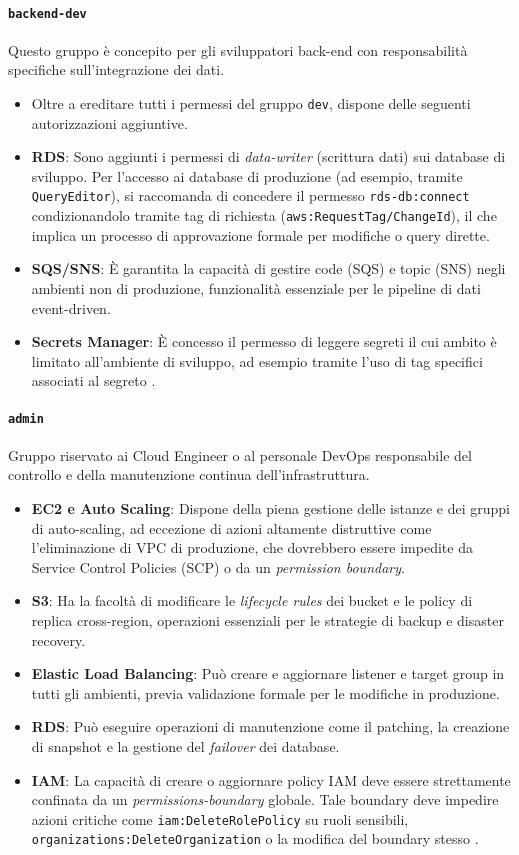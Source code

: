 \paragraph{\texttt{backend-dev}}
Questo gruppo è concepito per gli sviluppatori back-end con responsabilità specifiche sull'integrazione dei dati.
\begin{itemize}
  \item Oltre a ereditare tutti i permessi del gruppo \texttt{dev}, dispone delle seguenti autorizzazioni aggiuntive.
  \item \textbf{RDS}: Sono aggiunti i permessi di \emph{data-writer} (scrittura dati) sui database di sviluppo. Per l'accesso ai database di produzione (ad esempio, tramite \texttt{QueryEditor}), si raccomanda di concedere il permesso \texttt{rds-db:connect} condizionandolo tramite tag di richiesta (\texttt{aws:RequestTag/ChangeId}), il che implica un processo di approvazione formale per modifiche o query dirette.
  \item \textbf{SQS/SNS}: È garantita la capacità di gestire code (SQS) e topic (SNS) negli ambienti non di produzione, funzionalità essenziale per le pipeline di dati event-driven.
  \item \textbf{Secrets Manager}: È concesso il permesso di leggere segreti il cui ambito è limitato all'ambiente di sviluppo, ad esempio tramite l'uso di tag specifici associati al segreto \cite{AWSIAMBestPractices}.
\end{itemize}

\paragraph{\texttt{admin}}
Gruppo riservato ai Cloud Engineer o al personale DevOps responsabile del controllo e della manutenzione continua dell'infrastruttura.
\begin{itemize}
  \item \textbf{EC2 e Auto Scaling}: Dispone della piena gestione delle istanze e dei gruppi di auto-scaling, ad eccezione di azioni altamente distruttive come l'eliminazione di VPC di produzione, che dovrebbero essere impedite da Service Control Policies (SCP) o da un \emph{permission boundary}.
  \item \textbf{S3}: Ha la facoltà di modificare le \emph{lifecycle rules} dei bucket e le policy di replica cross-region, operazioni essenziali per le strategie di backup e disaster recovery.
  \item \textbf{Elastic Load Balancing}: Può creare e aggiornare listener e target group in tutti gli ambienti, previa validazione formale per le modifiche in produzione.
  \item \textbf{RDS}: Può eseguire operazioni di manutenzione come il patching, la creazione di snapshot e la gestione del \emph{failover} dei database.
  \item \textbf{IAM}: La capacità di creare o aggiornare policy IAM deve essere strettamente confinata da un \emph{permissions-boundary} globale. Tale boundary deve impedire azioni critiche come \texttt{iam:DeleteRolePolicy} su ruoli sensibili, \texttt{organizations:DeleteOrganization} o la modifica del boundary stesso \cite{AWSPermBoundaries}.
\end{itemize}

